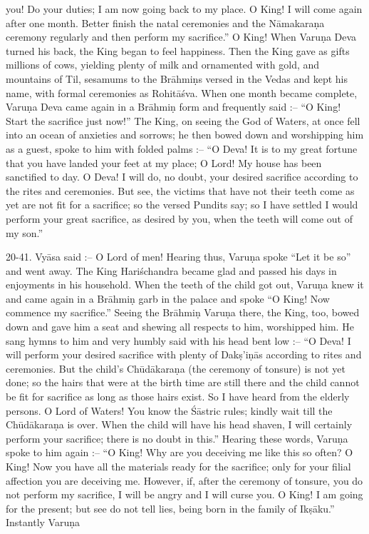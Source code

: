 you! Do your duties; I am now going back to my place. O King! I will come again after one month. Better finish the natal ceremonies and the N\=amakara\d{n}a ceremony regularly and then perform my sacrifice.'' O King! When Varu\d{n}a Deva turned his back, the King began to feel happiness. Then the King gave as gifts millions of cows, yielding plenty of milk and ornamented with gold, and mountains of Til, sesamums to the Br\=ahmi\d{n}s versed in the Vedas and kept his name, with formal ceremonies as Rohit\=a\'sva. When one month became complete, Varu\d{n}a Deva came again in a Br\=ahmi\d{n} form and frequently said :-- ``O King! Start the sacrifice just now!'' The King, on seeing the God of Waters, at once fell into an ocean of anxieties and sorrows; he then bowed down and worshipping him as a guest, spoke to him with folded palms :-- ``O Deva! It is to my great fortune that you have landed your feet at my place; O Lord! My house has been sanctified to day. O Deva! I will do, no doubt, your desired sacrifice according to the rites and ceremonies. But see, the victims that have not their teeth come as yet are not fit for a sacrifice; so the versed Pundits say; so I have settled I would perform your great sacrifice, as desired by you, when the teeth will come out of my son.''

20-41. Vy\=asa said :-- O Lord of men! Hearing thus, Varu\d{n}a spoke ``Let it be so'' and went away. The King Hari\'schandra became glad and passed his days in enjoyments in his household. When the teeth of the child got out, Varu\d{n}a knew it and came again in a Br\=ahmi\d{n} garb in the palace and spoke ``O King! Now commence my sacrifice.'' Seeing the Br\=ahmi\d{n} Varu\d{n}a there, the King, too, bowed down and gave him a seat and shewing all respects to him, worshipped him. He sang hymns to him and very humbly said with his head bent low :-- ``O Deva! I will perform your desired sacrifice with plenty of Dak\d{s}'i\d{n}\=as according to rites and ceremonies. But the child's Ch\=ud\=akara\d{n}a (the ceremony of tonsure) is not yet done; so the hairs that were at the birth time are still there and the child cannot be fit for sacrifice as long as those hairs exist. So I have heard from the elderly persons. O Lord of Waters! You know the \'S\=astric rules; kindly wait till the Ch\=ud\=akara\d{n}a is over. When the child will have his head shaven, I will certainly perform your sacrifice; there is no doubt in this.'' Hearing these words, Varu\d{n}a spoke to him again :-- ``O King! Why are you deceiving me like this so often? O King! Now you have all the materials ready for the sacrifice; only for your filial affection you are deceiving me. However, if, after the ceremony of tonsure, you do not perform my sacrifice, I will be angry and I will curse you. O King! I am going for the present; but see do not tell lies, being born in the family of Ik\d{s}\=aku.'' Instantly Varu\d{n}a


